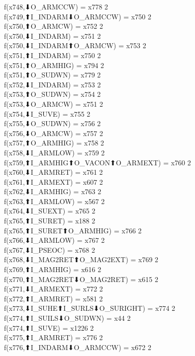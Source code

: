 f(x748,⬇O_ARMCCW) = x778 {2} \\
f(x749,⬆I_INDARM⬇O_ARMCCW) = x750 {2} \\
f(x750,⬆O_ARMCW) = x752 {2} \\
f(x750,⬇I_INDARM) = x751 {2} \\
f(x750,⬇I_INDARM⬆O_ARMCW) = x753 {2} \\
f(x751,⬆I_INDARM) = x750 {2} \\
f(x751,⬆O_ARMHIG) = x794 {2} \\
f(x751,⬆O_SUDWN) = x779 {2} \\
f(x752,⬇I_INDARM) = x753 {2} \\
f(x753,⬆O_SUDWN) = x754 {2} \\
f(x753,⬇O_ARMCW) = x751 {2} \\
f(x754,⬇I_SUVE) = x755 {2} \\
f(x755,⬇O_SUDWN) = x756 {2} \\
f(x756,⬇O_ARMCW) = x757 {2} \\
f(x757,⬆O_ARMHIG) = x758 {2} \\
f(x758,⬇I_ARMLOW) = x759 {2} \\
f(x759,⬆I_ARMHIG⬆O_VACON⬆O_ARMEXT) = x760 {2} \\
f(x760,⬇I_ARMRET) = x761 {2} \\
f(x761,⬆I_ARMEXT) = x607 {2} \\
f(x762,⬇I_ARMHIG) = x763 {2} \\
f(x763,⬆I_ARMLOW) = x567 {2} \\
f(x764,⬇I_SUEXT) = x765 {2} \\
f(x765,⬆I_SURET) = x188 {2} \\
f(x765,⬆I_SURET⬆O_ARMHIG) = x766 {2} \\
f(x766,⬇I_ARMLOW) = x767 {2} \\
f(x767,⬇I_PSEOC) = x768 {2} \\
f(x768,⬇I_MAG2RET⬆O_MAG2EXT) = x769 {2} \\
f(x769,⬆I_ARMHIG) = x616 {2} \\
f(x770,⬆I_MAG2RET⬇O_MAG2RET) = x615 {2} \\
f(x771,⬇I_ARMEXT) = x772 {2} \\
f(x772,⬆I_ARMRET) = x581 {2} \\
f(x773,⬇I_SUHE⬆I_SURLS⬇O_SURIGHT) = x774 {2} \\
f(x774,⬆I_SUILS⬇O_SUDWN) = x44 {2} \\
f(x774,⬆I_SUVE) = x1226 {2} \\
f(x775,⬆I_ARMRET) = x776 {2} \\
f(x776,⬆I_INDARM⬇O_ARMCCW) = x672 {2} \\
